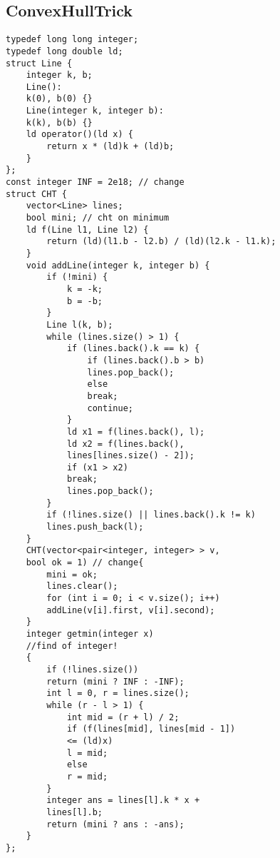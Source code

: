 \documentclass[14pt,fleqn]{article}
\begin{document}
\begin{multicols*}{2}
\subsection{ConvexHullTrick}
\begin{Verbatim}[tabsize=4]
typedef long long integer;
typedef long double ld;
struct Line {
	integer k, b;
	Line():
	k(0), b(0) {}
	Line(integer k, integer b):
	k(k), b(b) {}
	ld operator()(ld x) {
		return x * (ld)k + (ld)b;
	}
};
const integer INF = 2e18; // change
struct CHT {
	vector<Line> lines;
	bool mini; // cht on minimum
	ld f(Line l1, Line l2) {
		return (ld)(l1.b - l2.b) / (ld)(l2.k - l1.k);
	}
	void addLine(integer k, integer b) {
		if (!mini) {
			k = -k;
			b = -b;
		}
		Line l(k, b);
		while (lines.size() > 1) {
			if (lines.back().k == k) {
				if (lines.back().b > b)
				lines.pop_back();
				else
				break;
				continue;
			}
			ld x1 = f(lines.back(), l);
			ld x2 = f(lines.back(),
			lines[lines.size() - 2]);
			if (x1 > x2)
			break;
			lines.pop_back();
		}
		if (!lines.size() || lines.back().k != k)
		lines.push_back(l);
	}
	CHT(vector<pair<integer, integer> > v,
	bool ok = 1) // change{
		mini = ok;
		lines.clear();
		for (int i = 0; i < v.size(); i++)
		addLine(v[i].first, v[i].second);
	}
	integer getmin(integer x)
	//find of integer!
	{
		if (!lines.size())
		return (mini ? INF : -INF);
		int l = 0, r = lines.size();
		while (r - l > 1) {
			int mid = (r + l) / 2;
			if (f(lines[mid], lines[mid - 1])
			<= (ld)x)
			l = mid;
			else
			r = mid;
		}
		integer ans = lines[l].k * x +
		lines[l].b;
		return (mini ? ans : -ans);
	}
};
\end{Verbatim}

\end{multicols*}
\end{document}
